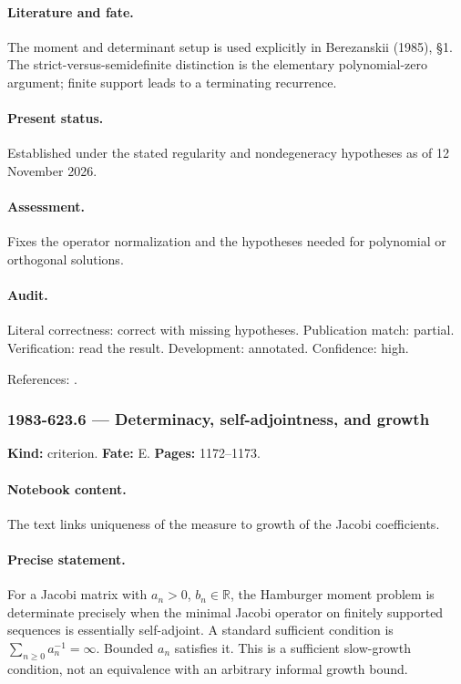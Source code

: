 \paragraph{Literature and fate.} The moment and determinant setup is used explicitly in Berezanskii (1985), \S1. The strict-versus-semidefinite distinction is the elementary polynomial-zero argument; finite support leads to a terminating recurrence.

\paragraph{Present status.} Established under the stated regularity and nondegeneracy hypotheses as of 12 November 2026.

\paragraph{Assessment.} Fixes the operator normalization and the hypotheses needed for polynomial or orthogonal solutions.

\paragraph{Audit.} Literal correctness: correct with missing hypotheses. Publication match: partial. Verification: read the result. Development: annotated. Confidence: high.

\noindent References: \citep{berezanskii1985integration}.\par

\subsubsection{1983-623.6 --- Determinacy, self-adjointness, and growth}

\label{item:1983-623.6}

\noindent\textbf{Kind:} criterion. \textbf{Fate:} E. \textbf{Pages:} 1172--1173.\par

\paragraph{Notebook content.} The text links uniqueness of the measure to growth of the Jacobi coefficients.

\paragraph{Precise statement.} For a Jacobi matrix with \(a_n>0\), \(b_n\in\mathbb R\), the Hamburger moment problem is determinate precisely when the minimal Jacobi operator on finitely supported sequences is essentially self-adjoint. A standard sufficient condition is \(\sum_{n\ge0}a_n^{-1}=\infty\). Bounded \(a_n\) satisfies it. This is a sufficient slow-growth condition, not an equivalence with an arbitrary informal growth bound.

